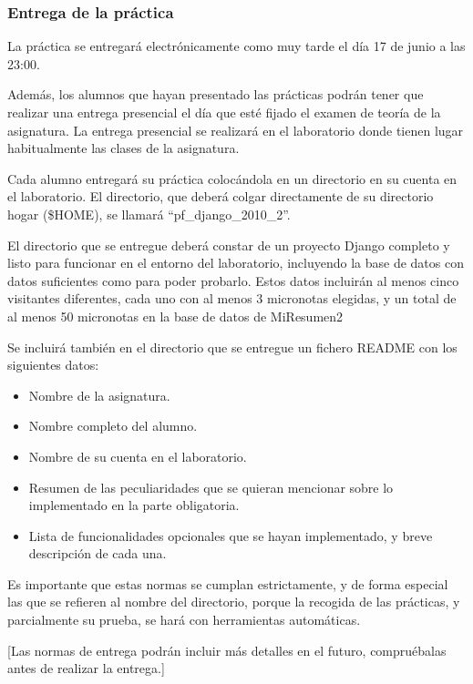 \subsubsection{Entrega de la práctica}

La práctica se entregará electrónicamente como muy tarde el día 17 de junio a las 23:00.

Además, los alumnos que hayan presentado las prácticas podrán tener que realizar una entrega presencial el día que esté fijado el examen de teoría de la asignatura. La entrega presencial se realizará en el laboratorio donde tienen lugar habitualmente las clases de la asignatura.

Cada alumno entregará su práctica colocándola en un directorio en su cuenta en el laboratorio. El directorio, que deberá colgar directamente de su directorio hogar (\$HOME), se llamará ``pf\_django\_2010\_2''.

El directorio que se entregue deberá constar de un proyecto Django completo y listo para funcionar en el entorno del laboratorio, incluyendo la base de datos con datos suficientes como para poder probarlo. Estos datos incluirán al menos cinco visitantes diferentes, cada uno con al menos 3 micronotas elegidas, y un total de al menos 50 micronotas en la base de datos de MiResumen2

Se incluirá también en el directorio que se entregue un fichero README con los siguientes datos:

\begin{itemize}
\item Nombre de la asignatura.
\item Nombre completo del alumno.
\item Nombre de su cuenta en el laboratorio.
\item Resumen de las peculiaridades que se quieran mencionar sobre lo implementado en la parte obligatoria.
\item Lista de funcionalidades opcionales que se hayan implementado, y breve descripción de cada una.
\end{itemize}

Es importante que estas normas se cumplan estrictamente, y de forma especial las que se refieren al nombre del directorio, porque la recogida de las prácticas, y parcialmente su prueba, se hará con herramientas automáticas.

[Las normas de entrega podrán incluir más detalles en el futuro, compruébalas antes de realizar la entrega.]


